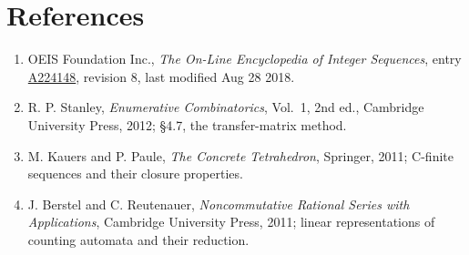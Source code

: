 \documentclass[11pt]{article}
\theoremstyle{definition}
\begin{document}
\section{References}

\begin{enumerate}

\item OEIS Foundation Inc., \emph{The On-Line Encyclopedia of Integer Sequences}, entry \href{https://oeis.org/A224148}{A224148}, revision 8, last modified Aug 28 2018.

\item R. P. Stanley, \emph{Enumerative Combinatorics}, Vol.~1, 2nd ed., Cambridge University Press, 2012; \S4.7, the transfer-matrix method.

\item M. Kauers and P. Paule, \emph{The Concrete Tetrahedron}, Springer, 2011; C-finite sequences and their closure properties.

\item J. Berstel and C. Reutenauer, \emph{Noncommutative Rational Series with Applications}, Cambridge University Press, 2011; linear representations of counting automata and their reduction.

\end{enumerate}
\end{document}

